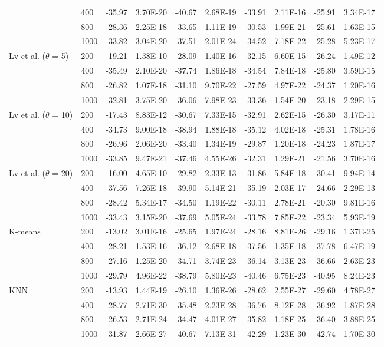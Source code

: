 \documentclass[11pt]{article}
\numberwithin{table}{section}
\numberwithin{figure}{section}
\begin{document}
\begin{landscape}
\begin{longtable}{p{4.2cm}lrrrrrrrr}
 & 400 & -35.97 & 3.70E-20 & -40.67 & 2.68E-19 & -33.91 & 2.11E-16 & -25.91 & 3.34E-17 \\
 & 800 & -28.36 & 2.25E-18 & -33.65 & 1.11E-19 & -30.53 & 1.99E-21 & -25.61 & 1.63E-15 \\
 & 1000 & -33.82 & 3.04E-20 & -37.51 & 2.01E-24 & -34.52 & 7.18E-22 & -25.28 & 5.23E-17 \\
\midrule
Lv et al. ($\theta$ = 5) & 200 & -19.21 & 1.38E-10 & -28.09 & 1.40E-16 & -32.15 & 6.60E-15 & -26.24 & 1.49E-12 \\
 & 400 & -35.49 & 2.10E-20 & -37.74 & 1.86E-18 & -34.54 & 7.84E-18 & -25.80 & 3.59E-15 \\
 & 800 & -26.82 & 1.07E-18 & -31.10 & 9.70E-22 & -27.59 & 4.97E-22 & -24.37 & 1.20E-16 \\
 & 1000 & -32.81 & 3.75E-20 & -36.06 & 7.98E-23 & -33.36 & 1.54E-20 & -23.18 & 2.29E-15 \\
\midrule
Lv et al. ($\theta$ = 10) & 200 & -17.43 & 8.83E-12 & -30.67 & 7.33E-15 & -32.91 & 2.62E-15 & -26.30 & 3.17E-11 \\
 & 400 & -34.73 & 9.00E-18 & -38.94 & 1.88E-18 & -35.12 & 4.02E-18 & -25.31 & 1.78E-16 \\
 & 800 & -26.96 & 2.06E-20 & -33.40 & 1.34E-19 & -29.87 & 1.20E-18 & -24.23 & 1.87E-17 \\
 & 1000 & -33.85 & 9.47E-21 & -37.46 & 4.55E-26 & -32.31 & 1.29E-21 & -21.56 & 3.70E-16 \\
\midrule
Lv et al. ($\theta$ = 20) & 200 & -16.00 & 4.65E-10 & -29.82 & 2.33E-13 & -31.86 & 5.84E-18 & -30.41 & 9.94E-14 \\
 & 400 & -37.56 & 7.26E-18 & -39.90 & 5.14E-21 & -35.19 & 2.03E-17 & -24.66 & 2.29E-13 \\
 & 800 & -28.42 & 5.34E-17 & -34.50 & 1.19E-22 & -30.11 & 2.78E-21 & -20.30 & 9.81E-16 \\
 & 1000 & -33.43 & 3.15E-20 & -37.69 & 5.05E-24 & -33.78 & 7.85E-22 & -23.34 & 5.93E-19 \\
\midrule
K-means & 200 & -13.02 & 3.01E-16 & -25.65 & 1.97E-24 & -28.16 & 8.81E-26 & -29.16 & 1.37E-25 \\
 & 400 & -28.21 & 1.53E-16 & -36.12 & 2.68E-18 & -37.56 & 1.35E-18 & -37.78 & 6.47E-19 \\
 & 800 & -27.16 & 1.25E-20 & -34.71 & 3.74E-23 & -36.14 & 3.13E-23 & -36.66 & 2.63E-23 \\
 & 1000 & -29.79 & 4.96E-22 & -38.79 & 5.80E-23 & -40.46 & 6.75E-23 & -40.95 & 8.24E-23 \\
\midrule
KNN & 200 & -13.93 & 1.44E-19 & -26.10 & 1.36E-26 & -28.62 & 2.55E-27 & -29.60 & 4.78E-27 \\
 & 400 & -28.77 & 2.71E-30 & -35.48 & 2.23E-28 & -36.76 & 8.12E-28 & -36.92 & 1.87E-28 \\
 & 800 & -26.53 & 2.71E-24 & -34.47 & 4.01E-27 & -35.82 & 1.18E-25 & -36.40 & 3.88E-25 \\
 & 1000 & -31.87 & 2.66E-27 & -40.67 & 7.13E-31 & -42.29 & 1.23E-30 & -42.74 & 1.70E-30 \\
\end{longtable}
\end{landscape}
\end{document}
